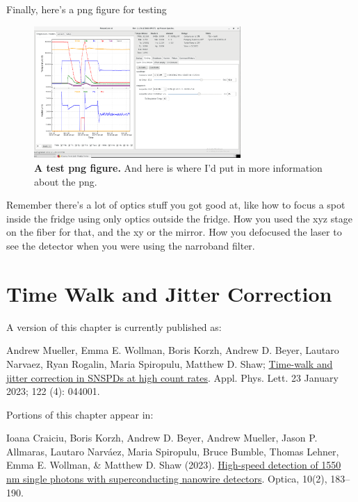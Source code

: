 \documentclass[11pt]{caltech_thesis} %
\begin{document}
Finally, here's a png figure for testing

\hypertarget{fig:test_png_figure}{%
\begin{figure}
\centering
\includegraphics[width=0.7\textwidth,height=\textheight]{chapter_01/figs_01/fridge.png}
\caption[{A png figure.}]{\textbf{A test png figure.} And here is where I'd put in more information about the png.}
\label{fig:test_png_figure}
\end{figure}
}

Remember there's a lot of optics stuff you got good at, like how to focus a spot inside the fridge using only optics outside the fridge. How you used the xyz stage on the fiber for that, and the xy or the mirror. How you defocused the laser to see the detector when you were using the narroband filter.

\hypertarget{time-walk-and-jitter-correction}{%
\chapter{Time Walk and Jitter Correction}\label{time-walk-and-jitter-correction}}

A version of this chapter is currently published as:

Andrew Mueller, Emma E. Wollman, Boris Korzh, Andrew D. Beyer, Lautaro Narvaez, Ryan Rogalin, Maria Spiropulu, Matthew D. Shaw; \href{https://pubs.aip.org/aip/apl/article/122/4/044001/2870246/Time-walk-and-jitter-correction-in-SNSPDs-at-high}{Time-walk and jitter correction in SNSPDs at high count rates}. Appl. Phys. Lett. 23 January 2023; 122 (4): 044001.

Portions of this chapter appear in:

Ioana Craiciu, Boris Korzh, Andrew D. Beyer, Andrew Mueller, Jason P. Allmaras, Lautaro Narváez, Maria Spiropulu, Bruce Bumble, Thomas Lehner, Emma E. Wollman, \& Matthew D. Shaw (2023). \href{https://opg.optica.org/optica/fulltext.cfm?uri=optica-10-2-183\&id=525546}{High-speed detection of 1550 nm single photons with superconducting nanowire detectors}. Optica, 10(2), 183--190.
\end{document}
